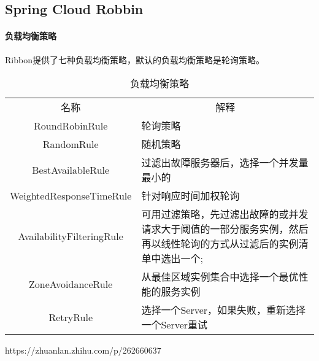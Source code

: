 \documentclass[../../../interview-questions.tex]{subfiles}
\begin{document}
\subsection{Spring Cloud Robbin}

\paragraph{负载均衡策略}

Ribbon提供了七种负载均衡策略，默认的负载均衡策略是轮询策略。

\begin{table}[htbp]
	\caption{负载均衡策略}
	\label{table:loadbalance}
	\begin{center}
		\begin{tabular}{cp{6cm}}
			\hline
			\multirow{1}{*}{名称}
			& \multicolumn{1}{c}{解释} \\			
			\cline{1-2}
			RoundRobinRule &  轮询策略            \\
			\hline
			RandomRule &  随机策略            \\
			\hline
			BestAvailableRule	 &  过滤出故障服务器后，选择一个并发量最小的            \\
			\hline	
            WeightedResponseTimeRule &  针对响应时间加权轮询            \\
			\hline
            AvailabilityFilteringRule &  可用过滤策略，先过滤出故障的或并发请求大于阈值的一部分服务实例，然后再以线性轮询的方式从过滤后的实例清单中选出一个;            \\
			\hline
            ZoneAvoidanceRule &  从最佳区域实例集合中选择一个最优性能的服务实例            \\
			\hline	
            RetryRule &  选择一个Server，如果失败，重新选择一个Server重试           \\
			\hline					
		\end{tabular}	
	\end{center}
\end{table}

https://zhuanlan.zhihu.com/p/262660637
\end{document}
